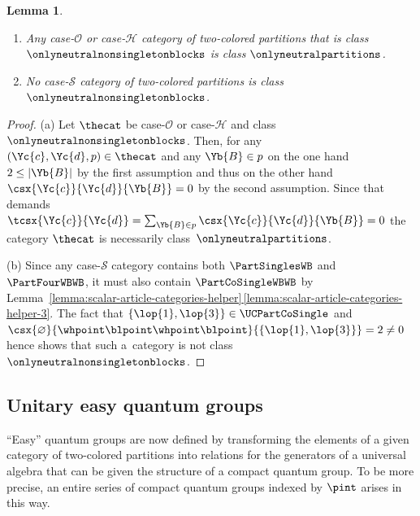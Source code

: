 \documentclass[pdftex]{sigma}
\numberwithin{equation}{section}
\newtheorem{Lemma}[Theorem]{Lemma}
\begin{document}
{
  \begin{Lemma}\quad
    \label{lemma:impossible-cases}
    \begin{enumerate}
    \item\label{lemma:impossible-cases-1} Any case-$\mathcal{O}$ or case-$\mathcal{H}$ category of two-colored partitions that is class $\onlyneutralnonsingletonblocks$ is class $\onlyneutralpartitions$.
    \item\label{lemma:impossible-cases-2} No case-$\mathcal{S}$ category of two-colored partitions  is class $\onlyneutralnonsingletonblocks$.
    \end{enumerate}
  \end{Lemma}
  \begin{proof}
      \newcommand{\anyblock}{\Yb{B}}
      \newcommand{\incol}{\Yc{c}}
      \newcommand{\outcol}{\Yc{d}}
      \newcommand{\thepartition}{p}
      (a) Let $\thecat$ be     case-$\mathcal{O}$ or case-$\mathcal{H}$ and class $\onlyneutralnonsingletonblocks$. Then, for any $(\incol,\outcol,\thepartition)\in \thecat$ and any $\anyblock\in \thepartition$ on the one hand  $2\leq |\anyblock|$ by the first assumption and thus on the other hand $\csx{\incol}{\outcol}{\anyblock}=0$ by the second assumption. Since that demands  $\tcsx{\incol}{\outcol}=\sum_{\anyblock\in\thepartition}\csx{\incol}{\outcol}{\anyblock}=0$ the category $\thecat$ is necessarily class~$\onlyneutralpartitions$.

(b) Since any case-$\mathcal{S}$ category contains both $\PartSinglesWB$ and $\PartFourWBWB$, it must also contain $\PartCoSingleWBWB$ by Lem\-ma~\hyperref[lemma:scalar-article-categories-helper-3]{\ref*{lemma:scalar-article-categories-helper}\,\ref*{lemma:scalar-article-categories-helper-3}}. The fact that $\{\lop{1},\lop{3}\}\in \UCPartCoSingle$ and $\csx{\varnothing}{\whpoint\blpoint\whpoint\blpoint}{\{\lop{1},\lop{3}\}}=2\neq 0$ hence shows that such a~category is not class $\onlyneutralnonsingletonblocks$.
  \end{proof}
}

\subsection{Unitary easy quantum groups}
\label{section:easy-relations}
``Easy'' quantum groups are now defined by transforming the elements of a given category of two-co\-lo\-red partitions into relations for the generators of a universal algebra that can be given the structure of a compact quantum group. To be more precise, an entire  series of compact quantum groups indexed by $\pint$ arises in this way.
\end{document}
